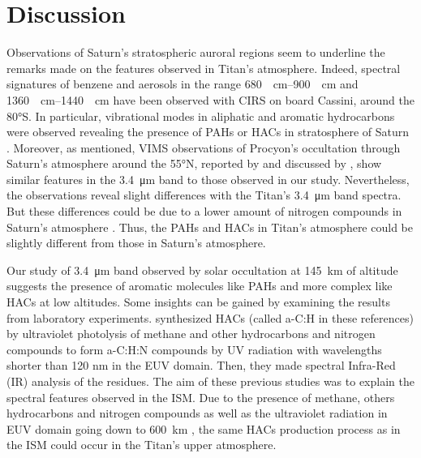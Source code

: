 \documentclass{arxiv-icarus}
\begin{document}
\section{Discussion}
\label{disc}

Observations of Saturn's stratospheric auroral regions \citep{Guerlet2015} seem to underline the remarks made on the features observed in Titan's atmosphere. Indeed, spectral signatures of benzene and aerosols in the range \SIrange{680}{900}{\per\cm} and \SIrange{1360}{1440}{\per\cm} have been observed with CIRS on board Cassini, around the \ang{80}S. In particular, vibrational modes in aliphatic and aromatic hydrocarbons were observed revealing the presence of PAHs or HACs in stratosphere of Saturn \citep{Guerlet2015}. Moreover, as mentioned, VIMS observations of Procyon's occultation through Saturn's atmosphere around the \ang{55}N, reported by \cite{Nicholson2006} and discussed by \cite{Bellucci2009}, show similar features in the \SI{3.4}{\um} band to those observed in our study. Nevertheless, the observations reveal slight differences with the Titan's \SI{3.4}{\um} band spectra. But these differences could be due to a lower amount of nitrogen compounds in Saturn's atmosphere \citep{Bellucci2009}. Thus, the PAHs and HACs in Titan's atmosphere could be slightly different from those in Saturn's atmosphere.

Our study of \SI{3.4}{\um} band observed by solar occultation at \SI{145}{km} of altitude suggests the presence of aromatic molecules like PAHs and more complex like HACs at low altitudes. Some insights can be gained by examining the results from laboratory experiments. \cite{Dartois2004,Dartois2005} synthesized HACs (called {a-C:H} in these references) by ultraviolet photolysis of methane \citep{Dartois2004} and other hydrocarbons and nitrogen compounds to form {a-C:H:N} compounds \citep{Dartois2005} by UV radiation with wavelengths shorter than 120 nm in the EUV domain. Then, they made spectral Infra-Red (IR) analysis of the residues. The aim of these previous studies was to explain the spectral features observed in the ISM. Due to the presence of methane, others hydrocarbons and nitrogen compounds as well as the ultraviolet radiation in EUV domain going down to \SI{600}{km} \citep{Yoon2014}, the same HACs production process as in the ISM could occur in the Titan's upper atmosphere.
\end{document}
